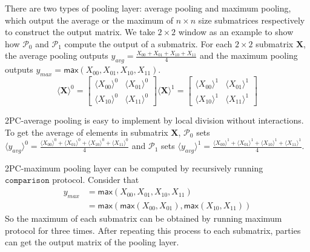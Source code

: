 \documentclass[letterpaper]{article} %
\begin{document}
    There are two types of pooling layer: average pooling and maximum pooling,
    which output the average or the maximum of $n\times n$ size submatrices respectively
    to construct the output matrix.
    We take $2\times 2$ window as an example to show how $\mathcal{P}_{0}$ and $\mathcal{P}_{1}$ compute the output of a submatrix.
    For each $2\times 2$ submatrix $\mathbf{X}$, the average pooling outputs $y_{avg}=\frac{X_{00}+ X_{01}+ X_{10}+  X_{11}}{4}$
    and the maximum pooling outputs $y_{max}=\mathsf{max}(X_{00}, X_{01}, X_{10},  X_{11})$.
    $$  \langle \mathbf{X}\rangle ^{0}= \begin{bmatrix}
        \langle X_{00}\rangle ^{0}& \langle X_{01}\rangle ^{0} \\
        \langle X_{10}\rangle ^{0}& \langle X_{11}\rangle ^{0}
       \end{bmatrix}\langle \mathbf{X}\rangle ^{1}=\begin{bmatrix}
        \langle X_{00}\rangle ^{1}& \langle X_{01}\rangle ^{1} \\
        \langle X_{10}\rangle ^{1}& \langle X_{11}\rangle ^{1}
       \end{bmatrix}$$

    2PC-average pooling is easy to implement by local division
    without interactions.
    To get the average of elements in submatrix $\mathbf{X}$,
    $\mathcal{P}_{0}$ sets $\langle y_{avg}\rangle^{0} = \frac{\langle X_{00}\rangle ^{0}+ \langle X_{01}\rangle ^{0}+
    \langle X_{10}\rangle ^{0}+ \langle X_{11}\rangle ^{0}}{4}$ and
    $\mathcal{P}_{1}$ sets $\langle y_{avg}\rangle^{1} = \frac{\langle X_{00}\rangle ^{1}+ \langle X_{01}\rangle ^{1}+
    \langle X_{10}\rangle ^{1}+ \langle X_{11}\rangle ^{1}}{4}$.

    2PC-maximum pooling layer can be computed by recursively running $\mathtt{comparison}$ protocol.
    Consider that
    \begin{align*}
        y_{max} &= \mathsf{max}(X_{00}, X_{01}, X_{10}, X_{11}) \\
        &= \mathsf{max}(\mathsf{max}(X_{00},X_{01}),\mathsf{max}( X_{10}, X_{11}))
    \end{align*}
    So the maximum of each submatrix can be obtained by running
    maximum protocol for three times.
    After repeating this process to each submatrix, parties can get the output matrix of the pooling layer.
\end{document}
